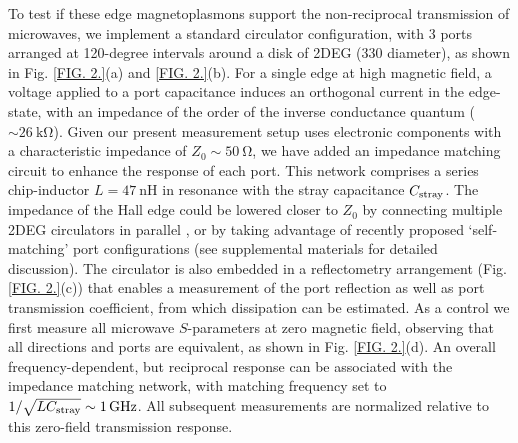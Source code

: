 To test if these edge magnetoplasmons support the non-reciprocal transmission of microwaves, we implement a standard circulator configuration, with 3 ports arranged at 120-degree intervals around a disk of 2DEG (\SI{330}{\micron} diameter), as shown in Fig. \ref{FIG. 2.}(a) and \ref{FIG. 2.}(b). For a single edge at high magnetic field, a voltage applied to a port capacitance induces an orthogonal current in the edge-state, with an impedance of the order of the inverse conductance quantum ($\sim \SI{26}{\kilo\ohm}$). Given our present measurement setup uses electronic components with a characteristic impedance of $Z_0 \sim \SI{50}{\ohm}$, we have added an impedance matching circuit to enhance the response of each port. This network comprises a series chip-inductor $L = \SI{47}{\nano\henry}$ in resonance with the stray capacitance $C_{\rm stray}$. The impedance of the Hall edge could be lowered closer to $Z_0$ by connecting multiple 2DEG circulators in parallel \cite{druist1998observation}, or by taking advantage of recently proposed `self-matching' port configurations \cite{bosco2016self,placke2016model} (see supplemental materials for detailed discussion). The circulator is also embedded in a reflectometry arrangement (Fig. \ref{FIG. 2.}(c)) that enables a measurement of the port reflection as well as port transmission coefficient, from which dissipation can be estimated. As a control we first measure all microwave $S$-parameters at zero magnetic field, observing that all directions and ports are equivalent, as shown in Fig. \ref{FIG. 2.}(d).  An overall frequency-dependent, but reciprocal response can be associated with the impedance matching network, with matching frequency set to $1/\sqrt{LC_{\rm stray}} \sim \SI{1}{\giga\hertz}$.  All subsequent measurements are normalized relative to this zero-field transmission response.

